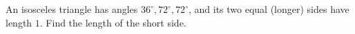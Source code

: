 An isosceles triangle has angles $36^\circ,72^\circ,72^\circ$, and its two equal (longer) sides have length $1$. Find the length of the short side.
